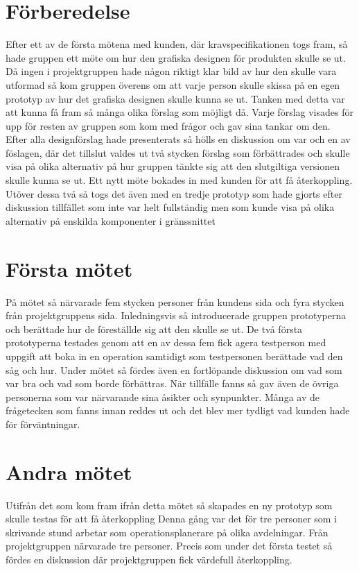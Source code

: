 \section{Förberedelse} 
Efter ett av de första mötena med kunden, där kravspecifikationen togs fram, så hade gruppen ett möte om hur den grafiska designen för produkten  skulle se ut. Då ingen i projektgruppen hade någon riktigt klar bild av hur den skulle vara utformad så kom gruppen överens om att varje person skulle skissa på en egen prototyp av hur det grafiska designen skulle kunna se ut. Tanken med detta var att kunna få fram så många olika förslag som möjligt då. Varje förslag visades för upp för resten av gruppen som kom med frågor och gav sina tankar om den. Efter alla designförslag hade presenterats så hölls en diskussion om var och en av föslagen, där det tillslut valdes ut två stycken förslag som förbättrades och skulle visa på olika alternativ på hur gruppen tänkte sig att den slutgiltiga versionen skulle kunna se ut. Ett nytt möte bokades in med kunden för att få återkoppling. Utöver dessa två så togs det även med en tredje prototyp som hade gjorts efter diskussion tillfället som inte var helt fullständig men som kunde visa på olika alternativ på enskilda komponenter i gränssnittet

\section{Första mötet} 
På mötet så närvarade fem stycken personer från kundens sida och fyra stycken från projektgruppens sida. Inledningsvis så introducerade gruppen prototyperna och berättade hur de föreställde sig att den skulle se ut.  De två första prototyperna testades genom att en av dessa fem fick agera testperson med uppgift att boka in en operation samtidigt som testpersonen berättade vad den såg och hur. Under mötet så fördes även en fortlöpande diskussion om vad som var bra och vad som borde förbättras. När tillfälle fanns så gav även de övriga personerna som var närvarande sina åsikter och synpunkter. Många av de frågetecken som fanns innan reddes ut och det blev mer tydligt vad kunden hade för förväntningar.  

\section{Andra mötet} 
Utifrån det som kom fram ifrån detta mötet så skapades en ny prototyp som skulle testas för att få återkoppling  Denna gång var det för tre personer som i skrivande stund arbetar som operationsplanerare på olika avdelningar. Från projektgruppen närvarade tre personer. Precis som under det första testet så fördes en diskussion där projektgruppen fick värdefull återkoppling. 

